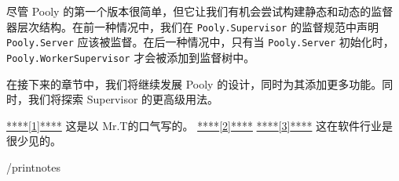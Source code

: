 尽管 Pooly
的第一个版本很简单，但它让我们有机会尝试构建静态和动态的监督器层次结构。在前一种情况中，我们在
\texttt{Pooly.Supervisor} 的监督规范中声明
\texttt{Pooly.Server}
应该被监督。在后一种情况中，只有当
\texttt{Pooly.Server}
初始化时，\texttt{Pooly.WorkerSupervisor}
才会被添加到监督树中。

在接下来的章节中，我们将继续发展 Pooly
的设计，同时为其添加更多功能。同时，我们将探索 Supervisor 的更高级用法。

\protect\hyperlink{u7YNvHigi67GoJPRzPXBQf4}{****{[}1{]}****} 这是以 Mr.T的口气写的。
\protect\hyperlink{unZsK4dstzhrpK6CA9DbDs8}{****{[}2{]}****} 
\protect\hyperlink{u5UHZe9erUMjrZtCEGXEoxG}{****{[}3{]}****}
这在软件行业是很少见的。

/printnotes